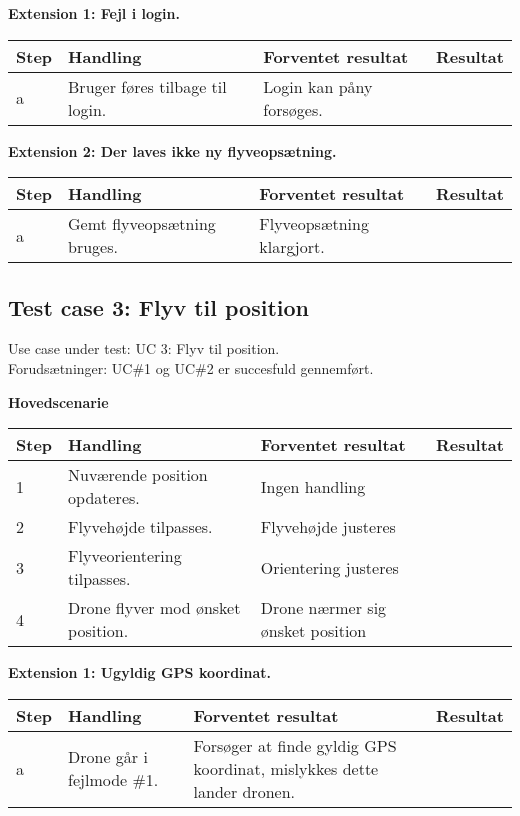\textbf{Extension 1: Fejl i login.}
\begin{table}[H]
	\centering
		\begin{tabular}{|l|p{5 cm}|p{5 cm}|p{3.5 cm}|} 
		\hline
			Step & Handling & Forventet resultat & Resultat\\ \hline
			a & Bruger føres tilbage til login. & Login kan påny forsøges. & \\ \hline
		\end{tabular}
\end{table}

\textbf{Extension 2: Der laves ikke ny flyveopsætning.}
\begin{table}[H]
	\centering
		\begin{tabular}{|l|p{5 cm}|p{5 cm}|p{3.5 cm}|} 
		\hline
			Step & Handling & Forventet resultat & Resultat\\ \hline
			a & Gemt flyveopsætning bruges. & Flyveopsætning klargjort. & \\ \hline
		\end{tabular}
\end{table}

\newpage

\subsection*{Test case 3: Flyv til position}
Use case under test: UC 3: Flyv til position.\\
Forudsætninger:	UC\#1 og UC\#2 er succesfuld gennemført.

\textbf{Hovedscenarie}
\begin{table}[H]
	\centering
		\begin{tabular}{|l|p{5 cm}|p{5 cm}|p{3.5 cm}|} 
		\hline
			Step & Handling & Forventet resultat & Resultat\\ \hline
			1 & Nuværende position opdateres. & Ingen handling  &  \\ \hline
			2 & Flyvehøjde tilpasses. & Flyvehøjde justeres &  \\ \hline
			3 & Flyveorientering tilpasses. & Orientering justeres &  \\ \hline
			4 & Drone flyver mod ønsket position. & Drone nærmer sig ønsket position  &  \\ \hline
		\end{tabular}
\end{table}

\textbf{Extension 1: Ugyldig GPS koordinat.}
\begin{table}[H]
	\centering
		\begin{tabular}{|l|p{5 cm}|p{5 cm}|p{3.5 cm}|} 
		\hline
			Step & Handling & Forventet resultat & Resultat\\ \hline
			a & Drone går i fejlmode \#1. & Forsøger at finde gyldig GPS koordinat, mislykkes dette lander dronen. & \\ \hline
		\end{tabular}
\end{table}

